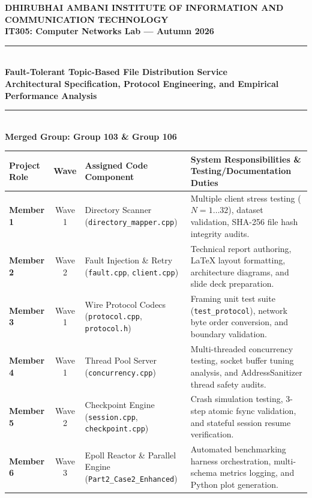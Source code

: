 \documentclass[11pt,a4paper]{article}
\begin{document}
\begin{titlepage}
    \centering
    \vspace*{0.5cm}
    
    {\Large \textbf{DHIRUBHAI AMBANI INSTITUTE OF INFORMATION AND COMMUNICATION TECHNOLOGY}}\\[0.3cm]
    {\large \textbf{IT305: Computer Networks Lab --- Autumn 2026}}\\[1.5cm]
    
    \rule{\linewidth}{1.5pt}\\[0.4cm]
    {\huge \bfseries \color{primaryblue} Fault-Tolerant Topic-Based File Distribution Service}\\[0.3cm]
    {\Large \bfseries Architectural Specification, Protocol Engineering, and Empirical Performance Analysis}\\[0.2cm]
    \rule{\linewidth}{1.5pt}\\[1.5cm]
    
    \textbf{\Large Merged Group: Group 103 \& Group 106}\\[0.8cm]
    
    \begin{table}[H]
        \centering
        \small
        \renewcommand{\arraystretch}{1.25}
        \begin{tabularx}{\textwidth}{l c l X}
            \toprule
            \textbf{Project Role} & \textbf{Wave} & \textbf{Assigned Code Component} & \textbf{System Responsibilities \& Testing/Documentation Duties} \\
            \midrule
            \textbf{Member 1} & Wave 1 & Directory Scanner (\texttt{directory\_mapper.cpp}) & Multiple client stress testing ($N = 1 \dots 32$), dataset validation, SHA-256 file hash integrity audits. \\
            \textbf{Member 2} & Wave 2 & Fault Injection \& Retry (\texttt{fault.cpp}, \texttt{client.cpp}) & Technical report authoring, \LaTeX{} layout formatting, architecture diagrams, and slide deck preparation. \\
            \textbf{Member 3} & Wave 1 & Wire Protocol Codecs (\texttt{protocol.cpp}, \texttt{protocol.h}) & Framing unit test suite (\texttt{test\_protocol}), network byte order conversion, and boundary validation. \\
            \textbf{Member 4} & Wave 1 & Thread Pool Server (\texttt{concurrency.cpp}) & Multi-threaded concurrency testing, socket buffer tuning analysis, and AddressSanitizer thread safety audits. \\
            \textbf{Member 5} & Wave 2 & Checkpoint Engine (\texttt{session.cpp}, \texttt{checkpoint.cpp}) & Crash simulation testing, 3-step atomic fsync validation, and stateful session resume verification. \\
            \textbf{Member 6} & Wave 3 & Epoll Reactor \& Parallel Engine (\texttt{Part2\_Case2\_Enhanced}) & Automated benchmarking harness orchestration, multi-schema metrics logging, and Python plot generation. \\
            \bottomrule
        \end{tabularx}
    \end{table}
    

\end{titlepage}
\end{document}
